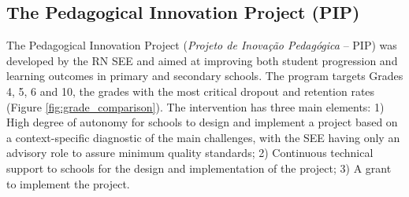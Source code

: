 \documentclass[11pt,a4paper]{article}
\begin{document}

\subsection{\textbf{The Pedagogical Innovation Project (PIP)}} \label{sec:pip}

The Pedagogical Innovation Project (\textit{Projeto de Inovação Pedagógica} -- PIP) was developed by the RN SEE and aimed at improving both student progression and learning outcomes in primary and secondary schools. The program targets Grades 4, 5, 6 and 10, the grades with the most critical dropout and retention rates (Figure \ref{fig:grade_comparison}). The intervention has three main elements: 1) High degree of autonomy for schools to design and implement a project based on a context-specific diagnostic of the main challenges, with the SEE having only an advisory role to assure minimum quality standards; 2) Continuous technical support to schools for the design and implementation of the project; 3) A grant to implement the project. 
\end{document}
